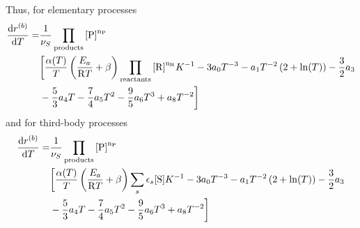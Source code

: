 Thus, for elementary processes
\begin{equation}
\begin{split}
\doverdT{\bkwdrate} =& \frac{1}{\scoef[S]} \prodProd \\
&\bigg[
        \frac{\kinMod}{T} \left(\frac{E_a}{\Rg T} + \beta\right)\prodReac \Eqconst^{-1}
                  - 3\tc{0}T^{-3} - \tc{1} T^{-2} \left(2 + \ln(T)\right) - \frac{3}{2} \tc{3} \\
&                 - \frac{5}{3} \tc{4} T - \frac{7}{4}\tc{5} T^2 - \frac{9}{5}\tc{6} T^3 + \tc{8} T^{-2} \bigg]
\end{split}
\end{equation}
and for third-body processes
\begin{equation}
\begin{split}
\doverdT{\bkwdrate} =& \frac{1}{\scoef[S]} \prodProd \\
&\bigg[
        \frac{\kinMod}{T} \left(\frac{E_a}{\Rg T} + \beta\right) \threeBody \Eqconst^{-1} 
                  - 3\tc{0}T^{-3} - \tc{1} T^{-2} \left(2 + \ln(T)\right) - \frac{3}{2} \tc{3} \\
&                 - \frac{5}{3} \tc{4} T - \frac{7}{4}\tc{5} T^2 - \frac{9}{5}\tc{6} T^3 + \tc{8} T^{-2} \bigg]
\end{split}
\end{equation}


